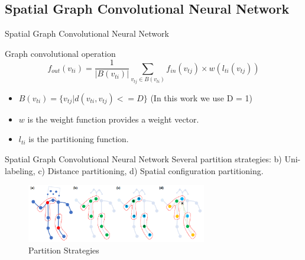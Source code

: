 \subsection{Spatial Graph Convolutional Neural Network}
\begin{frame}{Spatial Graph Convolutional Neural Network}
    \begin{block}{Graph convolutional operation}
        $$f_{out}(v_{ti}) = \frac{1}{|B(v_{ti})|} \sum_{v_{tj} \in B(v_{ti})} f_{in}(v_{tj}) \times w(l_{ti}(v_{tj}))$$
        \begin{itemize}
            \item $B(v_{ti}) = \{v_{tj} | d(v_{ti}, v_{tj}) <= D\}$ (In this work we use D = 1)
            \item $w$ is the weight function provides a weight vector.
            \item $l_{ti}$ is the partitioning function.
        \end{itemize}
    \end{block}
\end{frame}

\begin{frame}{Spatial Graph Convolutional Neural Network}
    Several partition strategies: b) Uni-labeling, c) Distance partitioning, d) Spatial configuration partitioning.
    \begin{figure}[htp]
        \centering
        \includegraphics[width=0.7\textwidth]{topics/201031-yan2018spatial/assets/img/gcn-partition.png}
        \caption{Partition Strategies}
        \label{fig:partition-strategies}
    \end{figure}
\end{frame}
